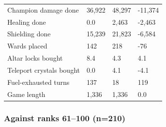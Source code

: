 \documentclass[
  10pt,
]{article}
\begin{document}
{\begin{longtable}[]{@{}llll@{}}
Champion damage done & 36,922 & 48,297 & -11,374 \\
Healing done & 0.0 & 2,463 & -2,463 \\
Shielding done & 15,239 & 21,823 & -6,584 \\
Wards placed & 142 & 218 & -76 \\
Altar locks bought & 8.4 & 4.3 & 4.1 \\
Teleport crystals bought & 0.0 & 4.1 & -4.1 \\
Fuel-exhausted turns & 137 & 18 & 119 \\
Game length & 1,336 & 1,336 & 0.0 \\
\end{longtable}
}

\subsubsection{Against ranks 61--100
(n=210)}\label{against-ranks-61100-n210}
\end{document}
